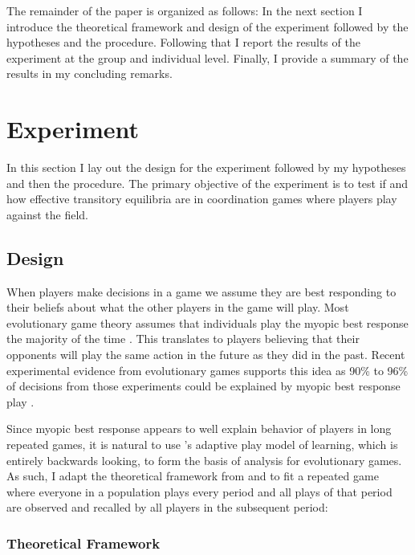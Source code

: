 The remainder of the paper is organized as follows: In the next section I introduce the theoretical framework and design of the experiment followed by the hypotheses and the procedure. Following that I report the results of the experiment at the group and individual level. Finally, I provide a summary of the results in my concluding remarks.

\section{Experiment}

In this section I lay out the design for the experiment followed by my hypotheses and then the procedure. The primary objective of the experiment is to test if and how effective transitory equilibria are in coordination games where players play against the field. 

\subsection{Design}

When players make decisions in a game we assume they are best responding to their beliefs about what the other players in the game will play. Most evolutionary game theory assumes that individuals play the myopic best response the majority of the time \citep{kandori1993, Canning1992, young1993evolution}. This translates to players believing that their opponents will play the same action in the future as they did in the past. Recent experimental evidence from evolutionary games supports this idea as 90\% to 96\% of decisions from those experiments could be explained by myopic best response play \citep{hwang2018conventional,mas2016behavioral,lim2016experimental}. 

Since myopic best response appears to well explain behavior of players in long repeated games, it is natural to use \cite{young1993evolution}'s adaptive play model of learning, which is entirely backwards looking, to form the basis of analysis for evolutionary games. As such, I adapt the theoretical framework from \cite{young1993evolution} and \cite{ellison2000basins} to fit a repeated game where everyone in a population plays every period and all plays of that period are observed and recalled by all players in the subsequent period:

\subsubsection{Theoretical Framework}

